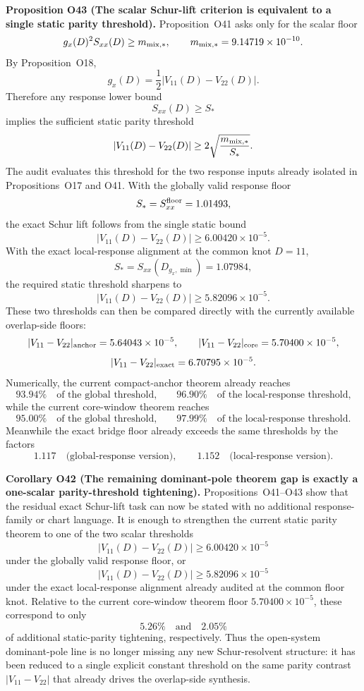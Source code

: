 \documentclass[aps,prd,onecolumn,notitlepage,nofootinbib,superscriptaddress,11pt,floatfix]{revtex4-2}
\begin{document}
\medskip\noindent\textbf{Proposition O43 (The scalar Schur-lift criterion is equivalent to a single static parity threshold).}
Proposition~O41 asks only for the scalar floor
\[
g_x(D)^2S_{xx}(D)\ge m_{{\rm mix},\ast},
\qquad
m_{{\rm mix},\ast}=9.14719\times10^{-10}.
\]
By Proposition~O18,
\[
g_x(D)=\frac12|V_{11}(D)-V_{22}(D)|.
\]
Therefore any response lower bound
\[
S_{xx}(D)\ge S_\ast
\]
implies the sufficient static parity threshold
\[
|V_{11}(D)-V_{22}(D)|
\ge
2\sqrt{\frac{m_{{\rm mix},\ast}}{S_\ast}}.
\]
The audit
evaluates this threshold for the two response inputs already isolated in Propositions~O17 and O41.  With the globally valid response floor
\[
S_\ast=S_{xx}^{\rm floor}=1.01493,
\]
the exact Schur lift follows from the single static bound
\[
|V_{11}(D)-V_{22}(D)|\ge 6.00420\times10^{-5}.
\]
With the exact local-response alignment at the common knot \(D=11\),
\[
S_\ast=S_{xx}(D_{g_x,\min})=1.07984,
\]
the required static threshold sharpens to
\[
|V_{11}(D)-V_{22}(D)|\ge 5.82096\times10^{-5}.
\]
These two thresholds can then be compared directly with the currently available overlap-side floors:
\[
|V_{11}-V_{22}|_{\rm anchor}=5.64043\times10^{-5},
\qquad
|V_{11}-V_{22}|_{\rm core}=5.70400\times10^{-5},
\]
\[
|V_{11}-V_{22}|_{\rm exact}=6.70795\times10^{-5}.
\]
Numerically, the current compact-anchor theorem already reaches
\[
93.94\%
\quad\text{of the global threshold,}
\qquad
96.90\%
\quad\text{of the local-response threshold,}
\]
while the current core-window theorem reaches
\[
95.00\%
\quad\text{of the global threshold,}
\qquad
97.99\%
\quad\text{of the local-response threshold.}
\]
Meanwhile the exact bridge floor already exceeds the same thresholds by the factors
\[
1.117
\quad\text{(global-response version)},
\qquad
1.152
\quad\text{(local-response version)}.
\]

\medskip\noindent\textbf{Corollary O42 (The remaining dominant-pole theorem gap is exactly a one-scalar parity-threshold tightening).}
Propositions~O41--O43 show that the residual exact Schur-lift task can now be stated with no additional response-family or chart language.  It is enough to strengthen the current static parity theorem to one of the two scalar thresholds
\[
|V_{11}(D)-V_{22}(D)|\ge 6.00420\times10^{-5}
\]
under the globally valid response floor, or
\[
|V_{11}(D)-V_{22}(D)|\ge 5.82096\times10^{-5}
\]
under the exact local-response alignment already audited at the common floor knot.  Relative to the current core-window theorem floor \(5.70400\times10^{-5}\), these correspond to only
\[
5.26\%
\quad\text{and}\quad
2.05\%
\]
of additional static-parity tightening, respectively.  Thus the open-system dominant-pole line is no longer missing any new Schur-resolvent structure: it has been reduced to a single explicit constant threshold on the same parity contrast \(|V_{11}-V_{22}|\) that already drives the overlap-side synthesis.
\end{document}
